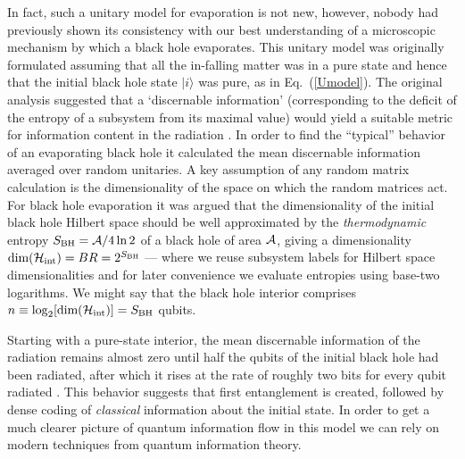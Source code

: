 \documentclass[aps,12pt]{revtex4}
\begin{document}
In fact, such a unitary model for evaporation is not new, however, nobody
had previously shown its consistency with our best understanding of a
microscopic mechanism by which a black hole evaporates. This unitary
model was originally formulated \cite{Page93} assuming that all the
in-falling matter was in a pure state and hence that the initial black
hole state $|i\rangle$ was pure, as in Eq.~(\ref{Umodel}). The original
analysis suggested that a `discernable information' (corresponding
to the deficit of the entropy of a subsystem from its maximal value)
would yield a suitable metric for information content in the
radiation \cite{Page93}. In order to find the ``typical'' behavior
of an evaporating black hole it calculated the mean discernable
information averaged over random unitaries. A key assumption of
any random matrix calculation is the dimensionality of the space on
which the random matrices act. For black hole evaporation it was
argued \cite{Page93,Susskind93} that the dimensionality of the initial black
hole Hilbert space should be well approximated by the
{\it thermodynamic\/} entropy $S_{\text{BH}}={\cal A}/4\ln 2$ of a black
hole of area ${\cal A}$, giving a dimensionality
$\text{dim}({\cal H}_\text{int})= BR= 2^{S_{\text{BH}}}$
--- where we reuse subsystem labels for Hilbert space dimensionalities
and for later convenience we evaluate entropies using base-two logarithms.
We might say that the black hole interior comprises
$n\equiv\log_2[\text{dim}({\cal H}_\text{int})]=S_{\text{BH}}$ qubits.

Starting with a pure-state interior, the mean discernable information
of the radiation remains almost zero until half the qubits of the
initial black hole had been radiated, after which it rises at
the rate of roughly two bits for every qubit radiated \cite{Page93}.
This behavior suggests that first entanglement is created, followed by
dense coding of {\it classical\/} information about the
initial state. In order to get a much clearer picture of quantum
information flow in this model we can rely on modern techniques from
quantum information theory.
\end{document}
